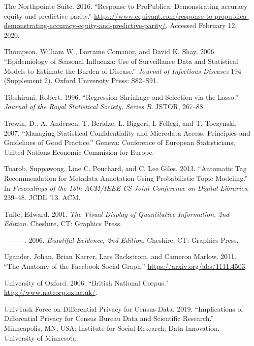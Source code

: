 \documentclass[]{krantz}
\begin{document}
\hypertarget{ref-northpointe2016}{}
The Northpointe Suite. 2016. ``Response to ProPublica: Demonstrating
accuracy equity and predictive parity.''
\url{https://www.equivant.com/response-to-propublica-demonstrating-accuracy-equity-and-predictive-parity/}.
Accessed February 12, 2020.

\hypertarget{ref-thompson2006epidemiology}{}
Thompson, William W., Lorraine Comanor, and David K. Shay. 2006.
``Epidemiology of Seasonal Influenza: Use of Surveillance Data and
Statistical Models to Estimate the Burden of Disease.'' \emph{Journal of
Infectious Diseases} 194 (Supplement 2). Oxford University Press:
S82--S91.

\hypertarget{ref-tibshirani1996regression}{}
Tibshirani, Robert. 1996. ``Regression Shrinkage and Selection via the
Lasso.'' \emph{Journal of the Royal Statistical Society, Series B}.
JSTOR, 267--88.

\hypertarget{ref-trewin2007managing}{}
Trewin, D., A. Andersen, T. Beridze, L. Biggeri, I. Fellegi, and T.
Toczynski. 2007. ``Managing Statistical Confidentiality and Microdata
Access: Principles and Guidelines of Good Practice.'' Geneva: Conference
of European Statisticians, United Nations Economic Commision for Europe.

\hypertarget{ref-tuarob-13}{}
Tuarob, Suppawong, Line C. Pouchard, and C. Lee Giles. 2013. ``Automatic
Tag Recommendation for Metadata Annotation Using Probabilistic Topic
Modeling.'' In \emph{Proceedings of the 13th ACM/IEEE-CS Joint
Conference on Digital Libraries}, 239--48. JCDL '13. ACM.

\hypertarget{ref-edward2001visual}{}
Tufte, Edward. 2001. \emph{The Visual Display of Quantitative
Information, 2nd Edition}. Cheshire, CT: Graphics Press.

\hypertarget{ref-edward2006beauty}{}
---------. 2006. \emph{Beautiful Evidence, 2nd Edition}. Cheshire, CT:
Graphics Press.

\hypertarget{ref-ugander2011}{}
Ugander, Johan, Brian Karrer, Lars Backstrom, and Cameron Marlow. 2011.
``The Anatomy of the Facebook Social Graph.''
\url{https://arxiv.org/abs/1111.4503}.

\hypertarget{ref-bnc}{}
University of Oxford. 2006. ``British National Corpus.''
\url{http://www.natcorp.ox.ac.uk/}.

\hypertarget{ref-UnivTaskForceonDifferentialPrivacyforCensusData2019}{}
UnivTask Force on Differential Privacy for Census Data. 2019.
``Implications of Differential Privacy for Census Bureau Data and
Scientific Research.'' Minneapolis, MN, USA: Institute for Social
Research; Data Innovation, University of Minnesota.
\end{document}
